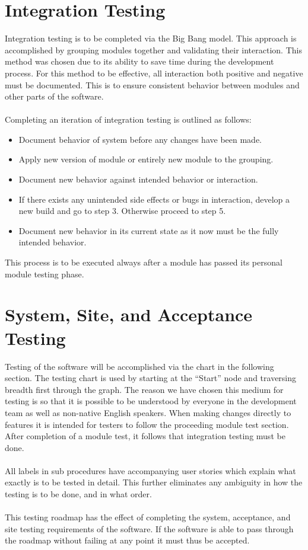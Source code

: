\documentclass[14pt]{article}
\begin{document}
\section{Integration Testing}
Integration testing is to be completed via the Big Bang model. This approach is accomplished by grouping modules together and validating their interaction. This method was chosen due to its ability to save time during the development process. For this method to be effective, all interaction both positive and negative must be documented. This is to ensure consistent behavior between modules and other parts of the software.\\ \\
Completing an iteration of integration testing is outlined as follows:
\begin{itemize}
	\item Document behavior of system before any changes have been made.
	\item Apply new version of module or entirely new module to the grouping.
	\item Document new behavior against intended behavior or interaction.
	\item If there exists any unintended side effects or bugs in interaction, develop a new build and go to step 3. Otherwise proceed to step 5.
	\item Document new behavior in its current state as it now must be the fully intended behavior.
\end{itemize}
This process is to be executed always after a module has passed its personal module testing phase.

\section{System, Site, and Acceptance Testing}
Testing of the software will be accomplished via the chart in the following section. The testing chart is used by starting at the “Start” node and traversing breadth first through the graph. The reason we have chosen this medium for testing is so that it is possible to be understood by everyone in the development team as well as non-native English speakers. When making changes directly to features it is intended for testers to follow the proceeding module test section. After completion of a module test, it follows that integration testing must be done.\\ \\
All labels in sub procedures have accompanying user stories which explain what exactly is to be tested in detail. This further eliminates any ambiguity in how the testing is to be done, and in what order. \\ \\
This testing roadmap has the effect of completing the system, acceptance, and site testing requirements of the software. If the software is able to pass through the roadmap without failing at any point it must thus be accepted.
\end{document}
